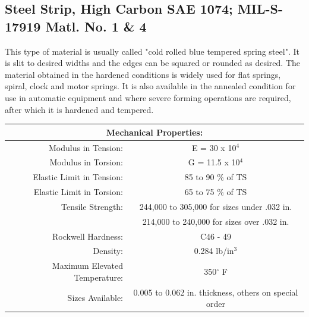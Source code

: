 \documentclass[10pt]{article}
\begin{document}
\subsection{Steel Strip, High Carbon SAE 1074; MIL-S-17919 Matl. No. 1 \& 4} %
This type of material is usually called "cold rolled blue tempered spring steel". 
It is slit to desired widths and the edges can be squared or rounded as desired. 
The material obtained in the hardened conditions is widely used for flat springs, spiral, clock and motor springs. 
It is also available in the annealed condition for use in automatic equipment and where severe forming operations are required, after which it is hardened and tempered.
\begin{center}
\begin{tabular}{ r c }
\multicolumn{2}{c}{Mechanical Properties:} \\
\hline
Modulus in Tension: & E = 30 x 10$^4$ \\  
Modulus in Torsion: & G = 11.5 x 10$^4$ \\
Elastic Limit in Tension: & 85 to 90 \% of TS \\  
Elastic Limit in Torsion: & 65 to 75 \% of TS \\
Tensile Strength: & 244,000 to 305,000 for sizes under .032 in. \\
& 214,000 to 240,000 for sizes over .032 in. \\
Rockwell Hardness: & C46 - 49 \\
Density: & 0.284 lb/in$^3$ \\
Maximum Elevated Temperature: & 350$^\circ$ F \\
Sizes Available: & 0.005 to 0.062 in. thickness, others on special order \\
\hline
\end{tabular}
\end{center}
\end{document}

